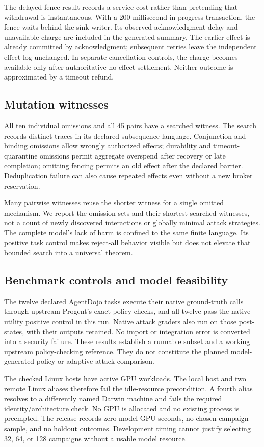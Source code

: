 The delayed-fence result records a service cost rather than pretending that
withdrawal is instantaneous. With a 200-millisecond in-progress transaction,
the fence waits behind the sink writer. Its observed acknowledgment delay and
unavailable charge are included in the generated summary. The earlier effect is
already committed by acknowledgment; subsequent retries leave the independent
effect log unchanged. In separate cancellation controls, the charge becomes
available only after authoritative no-effect settlement. Neither outcome is
approximated by a timeout refund.

\subsection{Mutation witnesses}
All ten individual omissions and all 45 pairs have a searched witness. The
search records \VTwoTraces{} distinct traces in its declared subsequence
language. Conjunction and binding omissions allow wrongly authorized effects;
durability and timeout-quarantine omissions permit aggregate overspend after
recovery or late completion; omitting fencing permits an old effect after the
declared barrier. Deduplication failure can also cause repeated effects even
without a new broker reservation.

Many pairwise witnesses reuse the shorter witness for a single omitted
mechanism. We report the omission sets and their shortest searched witnesses,
not a count of newly discovered interactions or globally minimal attack
strategies. The complete model's lack of harm is confined to the same finite
language. Its positive task control makes reject-all behavior visible but does
not elevate that bounded search into a universal theorem.

\subsection{Benchmark controls and model feasibility}
The twelve declared AgentDojo tasks execute their native ground-truth calls
through upstream Progent's exact-policy checks, and all twelve pass the native
utility positive control in this run. Native attack graders also run on those
post-states, with their outputs retained. No import or integration error is
converted into a security failure. These results establish a runnable subset
and a working upstream policy-checking reference. They do not constitute the
planned model-generated policy or adaptive-attack comparison.

The checked Linux hosts have active GPU workloads. The local host and two
remote Linux aliases therefore fail the idle-resource precondition. A fourth
alias resolves to a differently named Darwin machine and fails the required
identity/architecture check. No GPU is allocated and no existing process is
preempted. The release records zero model GPU seconds, no chosen campaign
sample, and no holdout outcomes. Development timing cannot justify selecting
32, 64, or 128 campaigns without a usable model resource.

